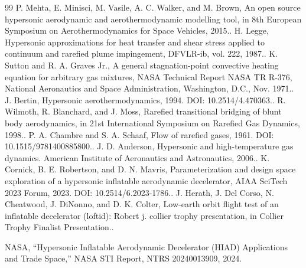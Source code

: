 \documentclass[conference]{IEEEtran}
\begin{document}
\begin{sloppypar}
\begin{thebibliography}{99}
 P. Mehta, E. Minisci, M. Vasile, A. C. Walker, and M. Brown, An open source hypersonic aerodynamic and aerothermodynamic modelling tool, in 8th European Symposium on Aerothermodynamics for Space Vehicles, 2015..
 H. Legge, Hypersonic approximations for heat transfer and shear stress applied to continuum and rarefied plume impingement, DFVLR-ib, vol. 222, 1987..
 K. Sutton and R. A. Graves Jr., A general stagnation-point convective heating equation for arbitrary gas mixtures, NASA Technical Report NASA TR R-376, National Aeronautics and Space Administration, Washington, D.C., Nov. 1971..
 J. Bertin, Hypersonic aerothermodynamics, 1994. DOI: 10.2514/4.470363..
 R. Wilmoth, R. Blanchard, and J. Moss, Rarefied transitional bridging of blunt body aerodynamics, in 21st International Symposium on Rarefied Gas Dynamics, 1998..
 P. A. Chambre and S. A. Schaaf, Flow of rarefied gases, 1961. DOI: 10.1515/9781400885800..
 J. D. Anderson, Hypersonic and high-temperature gas dynamics. American Institute of Aeronautics and Astronautics, 2006..
 K. Cornick, B. E. Robertson, and D. N. Mavris, Parameterization and design space exploration of a hypersonic inflatable aerodynamic decelerator, AIAA SciTech 2023 Forum, 2023. DOI: 10.2514/6.2023-1786..
 J. Herath, J. Del Corso, N. Cheatwood, J. DiNonno, and D. K. Colter, Low-earth orbit flight test of an inflatable decelerator (loftid): Robert j. collier trophy presentation, in Collier Trophy Finalist Presentation..

 NASA, ``Hypersonic Inflatable Aerodynamic Decelerator (HIAD) Applications and Trade Space,'' NASA STI Report, NTRS 20240013909, 2024.
\end{thebibliography}
\end{sloppypar}
\end{document}
